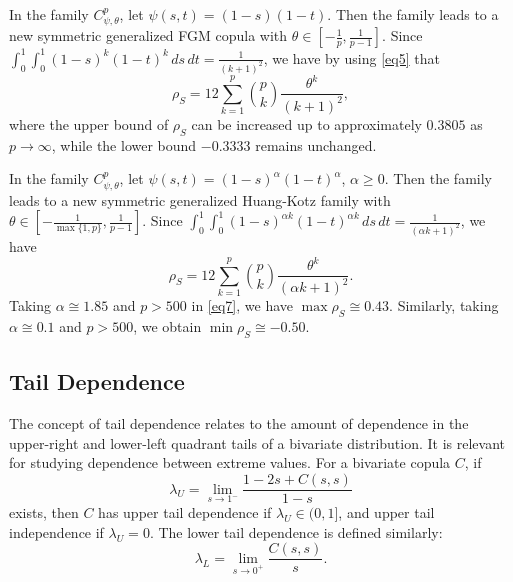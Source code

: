 \documentclass[twoside]{article}
\numberwithin{equation}{section}
\begin{document}
\begin{eg}\label{ex1}
In the family $C_{\psi,\theta}^p$, let $\psi(s,t) = (1-s)(1-t)$. Then the family leads to a new symmetric generalized FGM copula with $\theta \in \left[-\frac{1}{p}, \frac{1}{p-1}\right]$. Since $\int_0^1 \int_0^1 (1-s)^k(1-t)^k \, ds \, dt = \frac{1}{(k+1)^2}$, we have by using \eqref{eq5} that
\begin{equation}
\rho_S = 12 \sum_{k=1}^{p} \binom{p}{k} \frac{\theta^k}{(k+1)^2},
\end{equation}
where the upper bound of $\rho_S$ can be increased up to approximately $0.3805$ as $p \to \infty$, while the lower bound $-0.3333$ remains unchanged.
\end{eg}

\begin{eg}\label{ex2}
In the family $C_{\psi,\theta}^p$, let $\psi(s,t) = (1-s)^\alpha (1-t)^\alpha$, $\alpha \ge 0$. Then the family leads to a new symmetric generalized Huang-Kotz family with $\theta \in \left[-\frac{1}{\max\{1,p\}}, \frac{1}{p-1}\right]$. Since $\int_0^1 \int_0^1 (1-s)^{\alpha k}(1-t)^{\alpha k} \, ds \, dt = \frac{1}{(\alpha k + 1)^2}$, we have
\begin{equation}\label{eq7}
\rho_S = 12 \sum_{k=1}^{p} \binom{p}{k} \frac{\theta^k}{(\alpha k + 1)^2}.
\end{equation}
Taking $\alpha \cong 1.85$ and $p > 500$ in \eqref{eq7}, we have $\max \rho_S \cong 0.43$. Similarly, taking $\alpha \cong 0.1$ and $p > 500$, we obtain $\min \rho_S \cong -0.50$.
\end{eg}

\subsection{Tail Dependence}
The concept of tail dependence relates to the amount of dependence in the upper-right and lower-left quadrant tails of a bivariate distribution. It is relevant for studying dependence between extreme values. For a bivariate copula $C$, if
\begin{equation}\label{eq8}
\lambda_U = \lim_{s \to 1^-} \frac{1 - 2s + C(s,s)}{1-s}
\end{equation}
exists, then $C$ has upper tail dependence if $\lambda_U \in (0, 1]$, and upper tail independence if $\lambda_U = 0$. The lower tail dependence is defined similarly:
\begin{equation}\label{eq9}
\lambda_L = \lim_{s \to 0^+} \frac{C(s,s)}{s}.
\end{equation}
\end{document}
